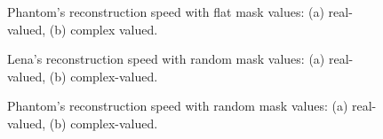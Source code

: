 \begin{figure}[H]
  \centering
  \quad{}
  \caption[Phantom's reconstruction speed with flat mask
  values.]{Phantom's reconstruction speed with flat mask values: (a)
    real-valued, (b) complex valued.}
  \label{fig:phantom-reconstruction-speed-flat-mask}
\end{figure}


\begin{figure}[H]
  \centering
  \quad
  \caption[Lena's reconstruction speed with random mask values]{Lena's
    reconstruction speed with random mask values: (a) real-valued, (b)
  complex-valued.}
  \label{fig:lena-reconstruction-speed-random-mask}
\end{figure}

\begin{figure}[H]
  \centering
  \quad
  \caption[Phantom's reconstruction speed with random mask
  values]{Phantom's reconstruction speed with random mask values: (a)
    real-valued, (b) complex-valued.}
  \label{fig:phantom-reconstruction-speed-random-mask}
\end{figure}

